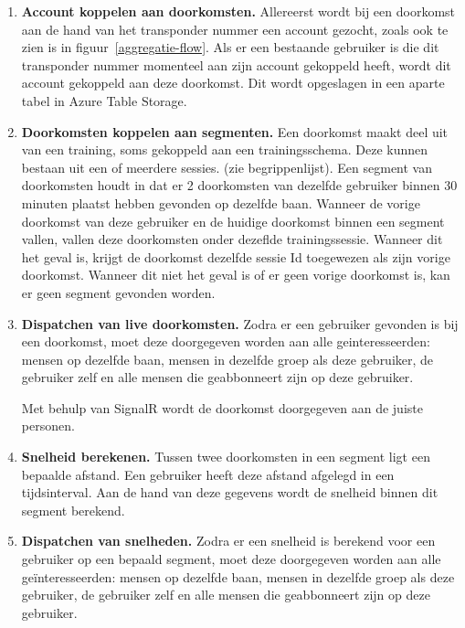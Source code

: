 \begin{enumerate}

\item \textbf{Account koppelen aan doorkomsten.}
Allereerst wordt bij een doorkomst aan de hand van het transponder nummer een account gezocht, zoals ook te zien is in figuur~\ref{aggregatie-flow}. Als er een bestaande gebruiker is die dit transponder nummer momenteel aan zijn account gekoppeld heeft, wordt dit account gekoppeld aan deze doorkomst. Dit wordt opgeslagen in een aparte tabel in Azure Table Storage.

\item \textbf{Doorkomsten koppelen aan segmenten.}
Een doorkomst maakt deel uit van een training, soms gekoppeld aan een trainingsschema. Deze kunnen bestaan uit een of meerdere sessies. (zie begrippenlijst). Een segment van doorkomsten houdt in dat er 2 doorkomsten van dezelfde gebruiker binnen 30 minuten plaatst hebben gevonden op dezelfde baan. Wanneer de vorige doorkomst van deze gebruiker en de huidige doorkomst binnen een segment vallen, vallen deze doorkomsten onder dezeflde trainingssessie. Wanneer dit het geval is, krijgt de doorkomst dezelfde sessie Id toegewezen als zijn vorige doorkomst. Wanneer dit niet het geval is of er geen vorige doorkomst is, kan er geen segment gevonden worden.

\item \textbf{Dispatchen van live doorkomsten.}
Zodra er een gebruiker gevonden is bij een doorkomst, moet deze doorgegeven worden aan alle geinteresseerden: mensen op dezelfde baan, mensen in dezelfde groep als deze gebruiker, de gebruiker zelf en alle mensen die geabbonneert zijn op deze gebruiker.

Met behulp van SignalR wordt de doorkomst doorgegeven aan de juiste personen.

\item \textbf{Snelheid berekenen.}
Tussen twee doorkomsten in een segment ligt een bepaalde afstand. Een gebruiker heeft deze afstand afgelegd in een tijdsinterval. Aan de hand van deze gegevens wordt de snelheid binnen dit segment berekend.

\item \textbf{Dispatchen van snelheden.}
Zodra er een snelheid is berekend voor een gebruiker op een bepaald segment, moet deze doorgegeven worden aan alle geïnteresseerden: mensen op dezelfde baan, mensen in dezelfde groep als deze gebruiker, de gebruiker zelf en alle mensen die geabbonneert zijn op deze gebruiker.


\end{enumerate}
